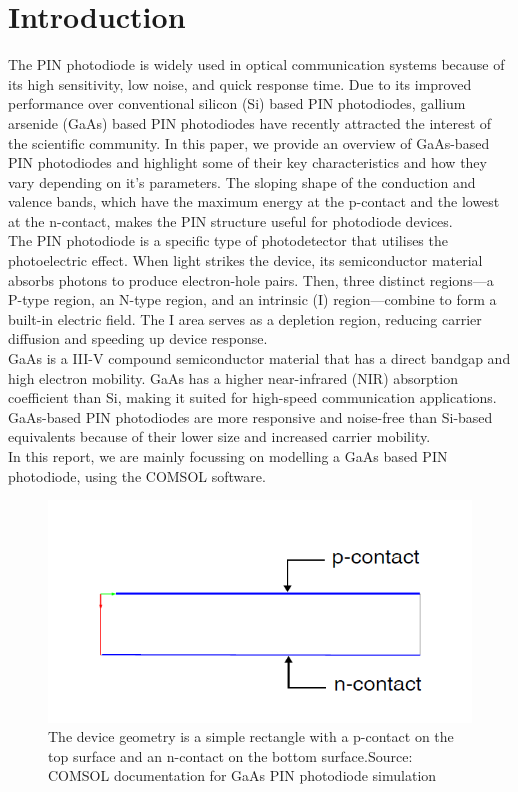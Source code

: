\documentclass[conference]{IEEEtran}
\begin{document}
\section{Introduction}
The PIN photodiode is widely used in optical communication systems because of its high sensitivity, low noise, and quick response time. Due to its improved performance over conventional silicon (Si) based PIN photodiodes, gallium arsenide (GaAs) based PIN photodiodes have recently attracted the interest of the scientific community. In this paper, we provide an overview of GaAs-based PIN photodiodes and highlight some of their key characteristics and how they vary depending on it's parameters. The sloping shape of the conduction and valence bands, which have the maximum energy at the p-contact and the lowest at the n-contact, makes the PIN structure useful for photodiode devices.\\

The PIN photodiode is a specific type of photodetector that utilises the photoelectric effect. When light strikes the device, its semiconductor material absorbs photons to produce electron-hole pairs. Then, three distinct regions—a P-type region, an N-type region, and an intrinsic (I) region—combine to form a built-in electric field. The I area serves as a depletion region, reducing carrier diffusion and speeding up device response.\\

GaAs is a III-V compound semiconductor material that has a direct bandgap and high electron mobility. GaAs has a higher near-infrared (NIR) absorption coefficient than Si, making it suited for high-speed communication applications. GaAs-based PIN photodiodes are more responsive and noise-free than Si-based equivalents because of their lower size and increased carrier mobility.\\

In this report, we are mainly focussing on modelling a GaAs based PIN photodiode, using the COMSOL software.

\begin{figure}
\begin{center}
\includegraphics[scale = 0.4]{Structure.png}
\caption{The device geometry is a simple rectangle with a p-contact on the top surface and an n-contact on the bottom surface.Source: COMSOL documentation for GaAs PIN photodiode simulation}
\end{center}
\end{figure}
\end{document}
